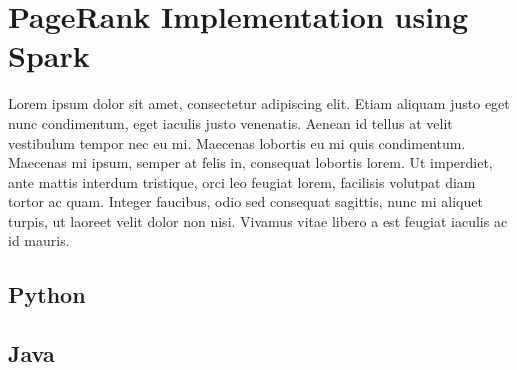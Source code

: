 \documentclass[11pt,a4paper]{article}
\begin{document}
\section{PageRank Implementation using Spark}
Lorem ipsum dolor sit amet, consectetur adipiscing elit. Etiam aliquam justo eget nunc condimentum, eget iaculis justo venenatis. Aenean id tellus at velit vestibulum tempor nec eu mi. Maecenas lobortis eu mi quis condimentum. Maecenas mi ipsum, semper at felis in, consequat lobortis lorem. Ut imperdiet, ante mattis interdum tristique, orci leo feugiat lorem, facilisis volutpat diam tortor ac quam. Integer faucibus, odio sed consequat sagittis, nunc mi aliquet turpis, ut laoreet velit dolor non nisi. Vivamus vitae libero a est feugiat iaculis ac id mauris.
\subsection{Python}
\subsection{Java}
\end{document}
